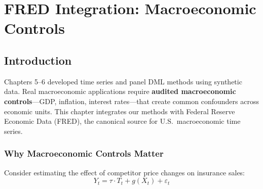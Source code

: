 
\chapter{FRED Integration: Macroeconomic Controls}
\label{ch:fred_integration}

\section{Introduction}\label{sec:ch07_introduction}

Chapters 5--6 developed time series and panel DML methods using synthetic data. Real macroeconomic applications require \textbf{audited macroeconomic controls}---GDP, inflation, interest rates---that create common confounders across economic units. This chapter integrates our methods with Federal Reserve Economic Data (FRED), the canonical source for U.S.\ macroeconomic time series.


\subsection{Why Macroeconomic Controls Matter}

Consider estimating the effect of competitor price changes on insurance sales:
\begin{equation}
Y_t = \tau \cdot T_t + g(X_t) + \varepsilon_t
\end{equation}

